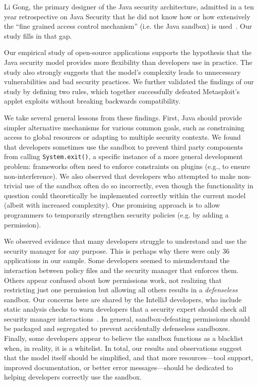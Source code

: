 \documentclass{sig-alternate-05-2015}
\begin{document}
Li Gong, the primary designer of the Java security architecture,
admitted in a ten year retrospective on Java Security that he did not
know how or how extensively the ``fine grained access control mechanism''
(i.e. the Java sandbox) is used~\cite{gong2009java}.
Our study fills in that gap.

Our empirical study of open-source applications
supports the hypothesis that the Java security
model provides more flexibility than developers use in practice.  The study also
strongly suggests that the model's complexity leads to unnecessary 
vulnerabilities and bad security practices. 
We further validated the findings of our study by defining two rules, which together successfully
defeated Metasploit's applet exploits without breaking backwards compatibility.

We take several general lessons from these findings.  First, Java should provide 
simpler alternative mechanisms for various common goals, such as constraining 
access to global resources or adapting to multiple security contexts. 
We found that developers sometimes use the sandbox to prevent third party components from calling
\texttt{System.exit()}, a specific instance of a more general development
problem: frameworks often need to enforce constraints on plugins
(e.g., to ensure non-interference).  We also observed that developers who attempted
to make non-trivial use of the sandbox often do so incorrectly, even though
the functionality in question could theoretically be implemented correctly
within the current model (albeit with increased complexity). 
One promising approach is to allow programmers
to temporarily strengthen security policies (e.g. by adding a permission). 

We observed evidence that many developers struggle to understand and
use the security manager for any purpose. This is perhaps why there
were only 36 applications in our sample. Some developers seemed to
misunderstand the interaction between policy files and the security
manager that enforces them. Others appear confused
about how permissions work, not realizing that
restricting just one permission but allowing all others results in a
\emph{defenseless} sandbox.  Our concerns here are shared by the IntelliJ developers,
who include static analysis checks to warn developers that a security expert
should check all security manager interactions~\cite{intelliJ}.  In general, sandbox-defeating permissions
should be packaged and segregated to prevent accidentally 
defenseless sandboxes. Finally, some developers appear to believe
the sandbox functions as a blacklist when, in reality, it is a whitelist.
In total, our results and observations suggest that the model itself should be simplified, and
that more resources---tool support, improved
documentation, or better error messages---should be dedicated to helping
developers correctly use the sandbox.
\end{document}
